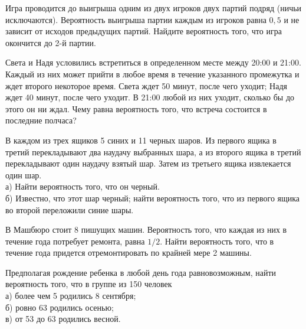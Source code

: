 \newpage\setcounter{zad}{0}



\begin{zkrW}{20}\noindent 
	Игра проводится до выигрыша одним из двух игроков двух партий подряд (ничьи исключаются). Вероятность выигрыша партии каждым из игроков равна $0{,}5$ и не зависит от исходов предыдущих партий. Найдите вероятность того, что игра окончится до 2-й партии.
 
\end{zkrW}

\begin{zkrW}{20}\noindent 
	Света и Надя условились встретиться в определенном месте между 20:00 и 21:00. Каждый из них может прийти в любое время в течение указанного промежутка и ждет второго некоторое время. Света ждет 50 минут, после чего уходит; Надя ждет 40 минут, после чего уходит. В 21:00 любой из них уходит, сколько бы до этого он ни ждал. Чему равна вероятность того, что встреча состоится в последние полчаса?
 
\end{zkrW}

\begin{zkrW}{20}\noindent 
	В каждом из трех ящиков 5 синих и 11 черных шаров. Из первого ящика в третий перекладывают два наудачу выбранных шара, а из второго ящика в третий перекладывают один наудачу взятый шар. Затем из третьего ящика извлекается один шар. \\ \indent а) Найти вероятность того, что он черный. \\ \indent б) Известно, что этот шар черный; найти вероятность того, что из первого ящика во второй переложили синие шары.
 
\end{zkrW}

\begin{zkrW}{20}\noindent 
	В Машбюро стоит 8 пишущих машин. Вероятность того, что каждая из них в течение года потребует ремонта, равна $1/2$. Найти вероятность того, что в течение года придется отремонтировать по крайней мере 2 машины.
 
\end{zkrW}

\begin{zkrW}{20}\noindent 
	Предполагая рождение ребенка в любой день года равновозможным, найти вероятность того, что в группе из 150 человек \\ \indent а) более чем 5 родились 8 сентября; \\ \indent б) ровно 63 родились осенью; \\ \indent в) от 53 до 63 родились весной.
 
\end{zkrW}

